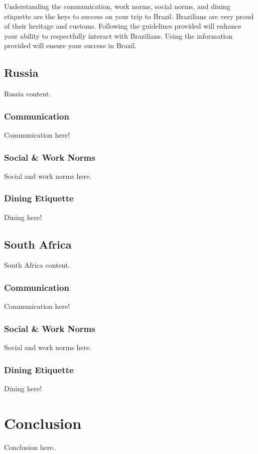 \documentclass[11pt,a4paper,oneside]{report}
\begin{document}
Understanding the communication, work norms, social norms, and dining etiquette
are the keys to success on your trip to Brazil. Brazilians are very proud of
their heritage and customs. Following the guidelines provided will enhance your
ability to respectfully interact with Brazilians. Using the information
provided will ensure your success in Brazil.

\subsection{Russia}\label{second}
Russia content.

\subsubsection{Communication}\label{third}
Communication here!

\subsubsection{Social \& Work Norms}\label{third}
Social and work norms here.

\subsubsection{Dining Etiquette}\label{third}
Dining here!

\subsection{South Africa}\label{second}

South Africa content.

\subsubsection{Communication}\label{third}
Communication here!

\subsubsection{Social \& Work Norms}\label{third}
Social and work norms here.

\subsubsection{Dining Etiquette}\label{third}
Dining here!

\section{Conclusion}\label{first}
Conclusion here..
\end{document}
